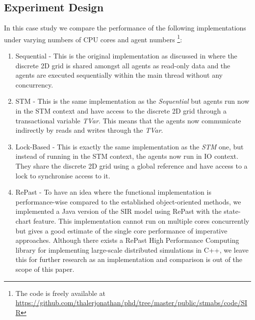 \subsection{Experiment Design}
In this case study we compare the performance of the following implementations under varying numbers of CPU cores and agent numbers \footnote{The code is freely available at \url{https://github.com/thalerjonathan/phd/tree/master/public/stmabs/code/SIR}}:

\begin{enumerate}
	\item Sequential - This is the original implementation as discussed in \cite{thaler_pure_2019} where the discrete 2D grid is shared amongst all agents as read-only data and the agents are executed sequentially within the main thread without any concurrency.
	\item STM - This is the same implementation as the \textit{Sequential} but agents run now in the STM context and have access to the discrete 2D grid through a transactional variable \textit{TVar}. This means that the agents now communicate indirectly by reads and writes through the \textit{TVar}.
	\item Lock-Based - This is exactly the same implementation as the \textit{STM} one, but instead of running in the STM context, the agents now run in IO context. They share the discrete 2D grid using a global reference and have access to a lock to synchronise access to it.
	\item RePast - To have an idea where the functional implementation is performance-wise compared to the established object-oriented methods, we implemented a Java version of the SIR model using RePast \cite{north_complex_2013} with the state-chart feature. This implementation cannot run on multiple cores concurrently but gives a good estimate of the single core performance of imperative approaches. Although there exists a RePast High Performance Computing library for implementing large-scale distributed simulations in C++, we leave this for further research as an implementation and comparison is out of the scope of this paper.
\end{enumerate}

